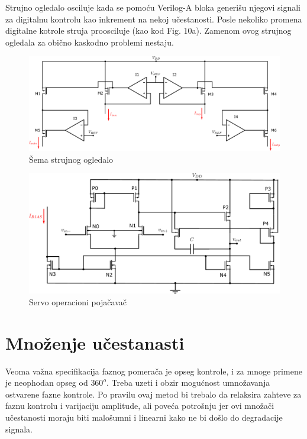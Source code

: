 \documentclass[journal,twocolumn,letterpaper]{IEEEJERM}
\begin{document}
Strujno ogledalo osciluje kada se pomoću Verilog-A bloka generišu njegovi signali za digitalnu kontrolu kao inkrement na nekoj učestanosti. Posle nekoliko promena digitalne kotrole struja proosciluje (kao kod \cite{zeki07} Fig. 10a). Zamenom ovog strujnog ogledala za obično kaskodno problemi nestaju.

\begin{figure}[!htbp]
  \centering
  \includegraphics[width=\linewidth]{mirror_detail.pdf}
  \caption{Šema strujnog ogledalo}
  \label{fig:mirror_detail}
\end{figure}


\begin{figure}[!htbp]
  \centering
  \includegraphics[width=\linewidth]{servo_oa.pdf}
  \caption{Servo operacioni pojačavač}
  \label{fig:servo_oa}
\end{figure}

\section{Množenje učestanasti}

Veoma važna specifikacija faznog pomerača je opseg kontrole, i za mnoge primene je neophodan opseg od $360^o$. Treba uzeti i obzir mogućnost umnožavanja ostvarene fazne kontrole. Po pravilu ovaj metod bi trebalo da relaksira zahteve za faznu kontrolu i varijaciju amplitude, ali poveća potrošnju jer ovi množači učestanosti moraju biti malošumni i linearni kako ne bi došlo do degradacije signala. \cite{ellinger10}
\end{document}
